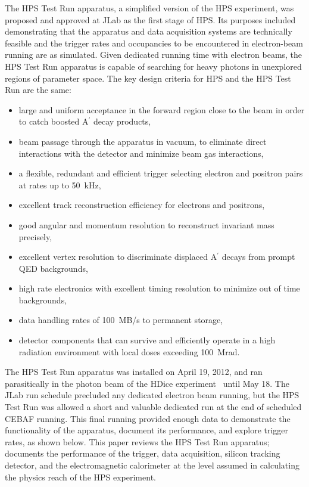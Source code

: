 \documentclass[final,3p,times,twocolumn]{elsarticle}
\newcommand{\Aprime}{A\ensuremath{^\prime}}
\begin{document}
The HPS Test Run apparatus, a simplified version of the HPS experiment, was proposed and 
approved at JLab as the first stage of HPS. 
Its purposes included demonstrating that the apparatus and data acquisition systems are 
technically feasible and  the trigger rates and occupancies to be encountered in electron-beam 
running are as simulated. Given dedicated running time with electron beams, the HPS Test Run 
apparatus is capable of searching for heavy photons in unexplored regions of parameter space.    
The key design criteria for HPS and the HPS Test Run are the same:
\begin{itemize}
\item large and uniform acceptance in the forward region close to the beam in order to catch boosted 
\Aprime{} decay products,
\item beam passage through the apparatus in vacuum, to eliminate direct interactions with the 
detector and minimize beam gas interactions, 
\item a flexible, redundant and efficient trigger selecting electron and positron pairs at rates up to 
50~kHz,
\item excellent track reconstruction efficiency for electrons and positrons,
\item good angular and momentum resolution to reconstruct invariant mass precisely,
\item excellent vertex resolution to discriminate displaced \Aprime{} decays from prompt QED 
backgrounds,
\item high rate electronics with excellent timing resolution to minimize out of time backgrounds,
\item data handling rates of 100~MB/s to permanent storage,
\item detector components that can survive and efficiently operate in a high radiation environment 
with local doses exceeding 100~Mrad.
\end{itemize}


The HPS Test Run apparatus was installed on April 19, 2012, and ran parasitically in the photon beam of the HDice 
experiment~\cite{HDice} until May 18. The JLab run schedule 
precluded any dedicated electron beam running, but the HPS Test Run was allowed a short and 
valuable dedicated run at the end of scheduled CEBAF running. This final running provided
enough data to demonstrate the functionality of the apparatus, document its performance, and
explore trigger rates, as shown below. 
This paper reviews the HPS Test Run apparatus; documents the performance of the trigger, 
data acquisition, silicon tracking detector, and the electromagnetic calorimeter at the level assumed 
in calculating the physics reach of the HPS experiment. 
\end{document}
